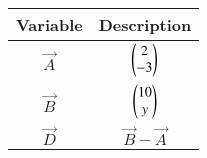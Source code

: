 \begin{tabular}[12pt]{ |c| c|}
    \hline
    \textbf{Variable} & \textbf{Description}\\ 
    \hline
    $\vec{A}$ & $\begin{pmatrix}2\\-3\end{pmatrix}$ \\
    \hline 
    $\vec{B}$ & $\begin{pmatrix}10\\y\end{pmatrix}$ \\
	\hline
    $\vec{D}$ & $\vec{B}-\vec{A}$\\
    \hline 
    \end{tabular}

